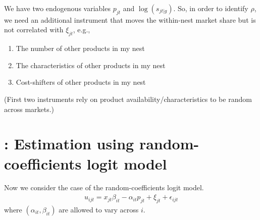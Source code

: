 \documentclass[11pt]{elegantbook}
\begin{document}
We have two endogenous variables $p_{jt}$ and $\log\left(s_{jt|g}\right)$. So, in order to identify $\rho$, we need an additional instrument that moves the within-nest market share but is not correlated with $\xi_{jt}$, e.g.,
\begin{enumerate}
    \item The number of other products in my nest
    \item  The characteristics of other products in my nest
    \item Cost-shifters of other products in my nest
\end{enumerate}
(First two instruments rely on product availability/characteristics to be random across markets.)
















\section{\cite{berry1995automobile}: Estimation using random-coefficients logit model}
Now we consider the case of the random-coefficients logit model.
\begin{equation}
    \begin{aligned}
        u_{ijt}=x_{jt}\beta_{it}-\alpha_{it}p_{jt}+\xi_{jt}+\epsilon_{ijt}
    \end{aligned}
    \nonumber
\end{equation}
where $(\alpha_{it},\beta_{it})$ are allowed to vary across $i$.
\end{document}
